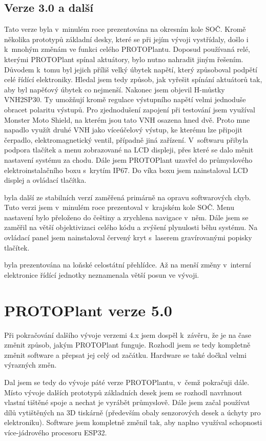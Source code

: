 \subsection{Verze 3.0 a další}
Tato verze byla v~minulém roce prezentována na okresním kole SOČ.
Kromě několika prototypů základní desky, které se při jejím vývoji vystřídaly, došlo i k~mnohým změnám ve funkci celého PROTOPlantu.
Doposud používaná relé, kterými PROTOPlant spínal aktuátory, bylo nutno nahradit jiným řešením.
Důvodem k~tomu byl jejich příliš velký úbytek napětí, který způsoboval podpětí celé řídící elektroniky.
Hledal jsem tedy způsob, jak vyřešit spínání aktuátorů tak, aby byl napěťový úbytek co nejmenší.
Nakonec jsem objevil H-můstky VNH2SP30. 
Ty umožňují kromě regulace výstupního napětí velmi jednoduše obracet polaritu výstupů.
Pro zjednodušení zapojení při testování jsem využíval Monster Moto Shield, na kterém jsou tato VNH osazena hned dvě.
Proto mne napadlo využít druhé VNH jako víceúčelový výstup, ke kterému lze připojit čerpadlo, elektromagnetický ventil, případně jiná zařízení.
V~softwaru přibyla podpora tlačítek a menu zobrazované na LCD displeji, přes které se dalo měnit nastavení systému za chodu.
Dále jsem PROTOPlant uzavřel do průmyslového elektroinstalačního boxu s~krytím IP67.
Do víka boxu jsem nainstaloval LCD displej a ovládací tlačítka.
\newline

\noindent{} byla další ze stabilních verzí zaměřená primárně na opravu softwarových chyb.
Tuto verzi jsem v~minulém roce prezentoval v~krajském kole SOČ.
Menu nastavení bylo přeloženo do češtiny a zrychlena navigace v~něm.
Dále jsem se zaměřil na větší objektivizaci celého kódu a zvýšení plynulosti běhu systému.
Na ovládací panel jsem nainstaloval červený kryt s~laserem gravírovanými popisky tlačítek.
\newline

\noindent{} byla prezentována na loňské celostátní přehlídce.
Až na menší změny v~interní elektronice řídící jednotky neznamenala větší posun ve vývoji.

\section{PROTOPlant verze 5.0}
Při pokračování dalšího vývoje verzemi 4.x jsem dospěl k~závěru, že je na čase změnit způsob, jakým PROTOPlant funguje.
Rozhodl jsem se tedy kompletně změnit software a přepsat jej celý od začátku.
Hardware se také dočkal velmi výrazných změn.

Dal jsem se tedy do vývoje páté verze PROTOPlantu, v~čemž pokračuji dále.
Místo vývoje dalších prototypů základních desek jsem se rozhodl navrhnout vlastní tištěné spoje a nechat je vyrábět průmyslově.
Dále jsem začal používat dílů vytištěných na 3D tiskárně (především obaly senzorových desek a úchyty pro elektroniku).
Software jsem kompletně změnil tak, aby naplno využíval schopnosti více-jádrového procesoru ESP32.

\newpage